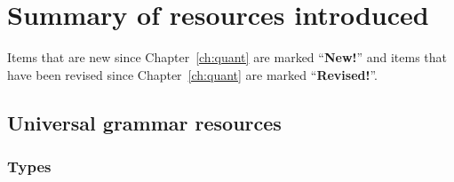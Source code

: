 

  

\section{Summary of resources introduced}
\label{sec:sumresch8}




Items that are new since Chapter~\ref{ch:quant} are marked
``\textbf{New!}'' and items that have been revised since
Chapter~\ref{ch:quant} are marked ``\textbf{Revised!}''.  %

\subsection{Universal grammar resources} 

\subsubsection{Types} 

